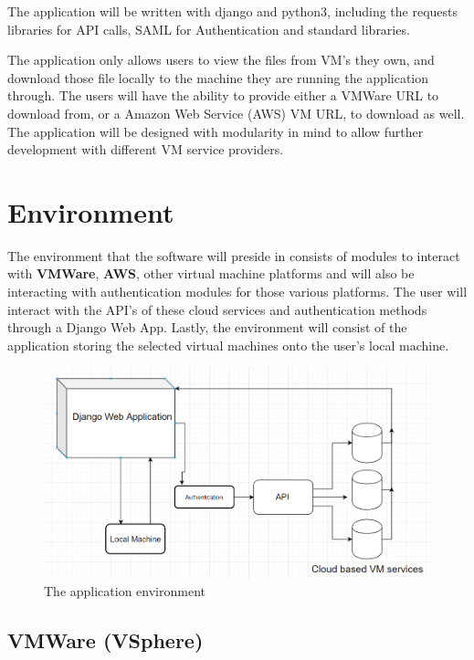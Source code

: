 \documentclass{article}
\begin{document}
    The application will be written with django and python3, including the requests libraries for API calls, SAML for Authentication
    and standard libraries.

    The application only allows users to view the files from VM's they own, and download those file locally to the machine they 
    are running the application through. The users will have the ability to provide either a VMWare URL to download from, or a 
    Amazon Web Service (AWS) VM URL, to download as well. The application will be designed with modularity in mind to allow further 
    development with different VM service providers.  
    \section{Environment}
    The environment that the software will preside in consists of modules to interact with \textbf{VMWare}, 
    \textbf{AWS}, other virtual machine platforms and will also be interacting with authentication modules for those
    various platforms. The user will interact with the API's of these cloud services and authentication
    methods through a Django Web App. Lastly, the environment will consist of the application storing the selected
    virtual machines onto the user's local machine.

    \begin{figure}[h]
    \includegraphics[scale=.7]{diagram}
        \caption{The application environment}
    \end{figure}

        \subsection{VMWare (VSphere)}
\end{document}
